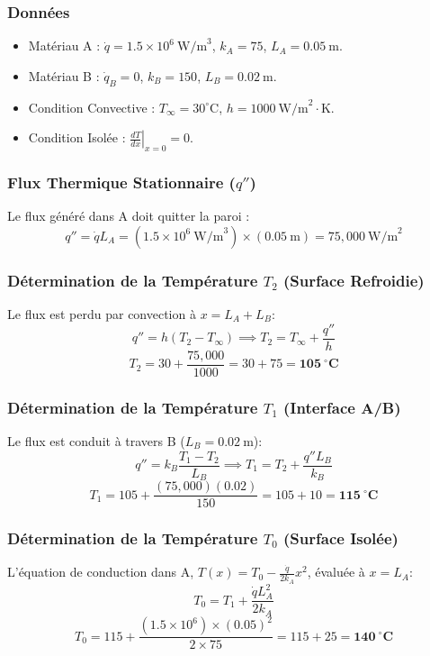 \documentclass{rapportECL}
\begin{document}
\subsubsection*{Données}
\begin{itemize}
    \item Matériau A : $\dot{q} = 1.5 \times 10^6 \ \text{W/m}^3$, $k_A=75$, $L_A=0.05 \ \text{m}$. 
    \item Matériau B : $\dot{q}_B=0$, $k_B=150$, $L_B=0.02 \ \text{m}$. 
    \item Condition Convective : $T_{\infty}=30^\circ\text{C}$, $h=1000 \ \text{W/m}^2\cdot\text{K}$. 
    \item Condition Isolée : $\left.\frac{dT}{dx}\right|_{x=0} = 0$. 
\end{itemize}

\subsubsection*{Flux Thermique Stationnaire ($q''$)}
Le flux généré dans A doit quitter la paroi :
$$q'' = \dot{q} L_A = (1.5 \times 10^6 \ \text{W/m}^3) \times (0.05 \ \text{m}) = 75,000 \ \text{W/m}^2$$

\subsubsection*{Détermination de la Température $T_2$ (Surface Refroidie)}
Le flux est perdu par convection à $x=L_A+L_B$:
$$q'' = h (T_2 - T_{\infty}) \implies T_2 = T_{\infty} + \frac{q''}{h}$$
$$T_2 = 30 + \frac{75,000}{1000} = 30 + 75 = \mathbf{105 \ ^\circ\text{C}}$$ 

\subsubsection*{Détermination de la Température $T_1$ (Interface A/B)}
Le flux est conduit à travers B ($L_B=0.02 \ \text{m}$):
$$q'' = k_B \frac{T_1 - T_2}{L_B} \implies T_1 = T_2 + \frac{q'' L_B}{k_B}$$
$$T_1 = 105 + \frac{(75,000)(0.02)}{150} = 105 + 10 = \mathbf{115 \ ^\circ\text{C}}$$

\subsubsection*{Détermination de la Température $T_0$ (Surface Isolée)}
L'équation de conduction dans A, $T(x) = T_0 - \frac{\dot{q}}{2 k_A} x^2$, évaluée à $x=L_A$:
$$T_0 = T_1 + \frac{\dot{q} L_A^2}{2 k_A}$$
$$T_0 = 115 + \frac{(1.5 \times 10^6) \times (0.05)^2}{2 \times 75} = 115 + 25 = \mathbf{140 \ ^\circ\text{C}}$$ 
\end{document}
